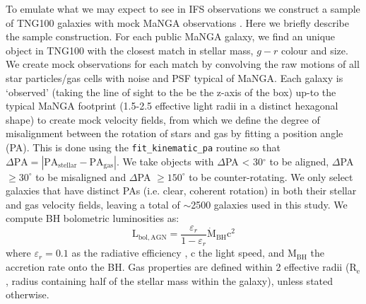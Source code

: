 \documentclass[fleqn,usenatbib]{mnras}
\begin{document}
To emulate what we may expect to see in IFS observations we construct a sample of TNG100 galaxies with mock MaNGA observations \citep[a complete description is given in][]{duckworth2019}. Here we briefly describe the sample construction. 
For each public MaNGA galaxy, we find an unique object in TNG100 with the closest match in stellar mass, $g-r$ colour and size. We create mock observations for each match by convolving the raw motions of all star particles/gas cells with noise and PSF typical of MaNGA. Each galaxy is `observed' (taking the line of sight to the be the z-axis of the box) up-to the typical MaNGA footprint (1.5-2.5 effective light radii in a distinct hexagonal shape) to create mock velocity fields, from which we define the degree of misalignment between the rotation of stars and gas by fitting a position angle (PA). This is done using the \texttt{fit\_kinematic\_pa} routine \citep[see Appendix C of][]{krajnovic2006} so that $\Delta\mathrm{PA = |PA_{stellar} - PA_{gas}|}$. We take objects with $\Delta$PA < 30$^{\circ}$ to be aligned, $\Delta$PA $ \geq 30^{\circ}$ to be misaligned and $\Delta$PA $\geq 150^{\circ}$ to be counter-rotating. We only select galaxies that have distinct PAs (i.e. clear, coherent rotation) in both their stellar and gas velocity fields, leaving a total of $\sim$2500 galaxies used in this study. We compute BH bolometric luminosities as:
\begin{equation}
\mathrm{L_{bol, AGN}} = \frac{\varepsilon_r}{1 - \varepsilon_r} \mathrm{\dot{M}_{BH} c^2}
\end{equation}
where $\varepsilon_r=0.1$ as the radiative efficiency \citep[see discussion in][]{habouzit2019}, c the light speed, and $\mathrm{M_{BH}}$ the accretion rate onto the BH. Gas properties are defined within 2 effective radii ($\mathrm{R_{e}}$, radius containing half of the stellar mass within the galaxy), unless stated otherwise.
\end{document}
